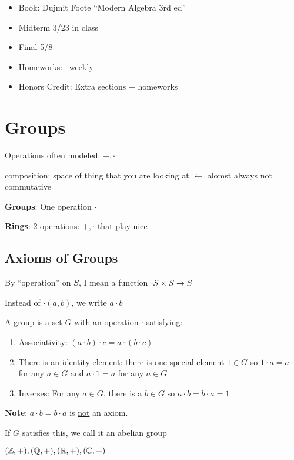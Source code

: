 
\begin{itemize}
  \item Book: Dujmit Foote ``Modern Algebra 3rd ed''
  \item Midterm 3/23 in class
  \item Final 5/8
  \item Homeworks: ~weekly
  \item Honors Credit: Extra sections + homeworks
\end{itemize}


\chapter{Groups}
Operations often modeled:
$+, \cdot$

composition: space of thing that you are looking at $\leftarrow$ alomst always not commutative

\textbf{Groups}: One operation $\cdot$

\textbf{Rings}: 2 operations: $+, \cdot$ that play nice


\section{Axioms of Groups}

By ``operation'' on $S$, I mean a function $\cdot S \times S \rightarrow S$

Instead of $\cdot(a, b)$, we write $a \cdot b$

A group is a set $G$ with an operation $\cdot$ satisfying:
\begin{enumerate}
  \item Associativity: $(a \cdot b) \cdot c = a \cdot (b \cdot c)$
  \item There is an identity element: there is one special element $1 \in G$ so $1 \cdot a  = a$ for any $a \in G$
  and $a \cdot 1 = a$ for any $a \in G$
  \item Inverses: For any $a \in G$, there is a $b \in G$ so $a \cdot b = b \cdot a = 1$

\end{enumerate}

\textbf{Note}: $a \cdot b = b\cdot a$ is \underline{not} an axiom.

If $G$ satisfies this, we call it an abelian group

\begin{example}
  $(\mathbb Z, +), (\mathbb Q, +), (\mathbb R, +), (\mathbb C, +)$
\end{example}

